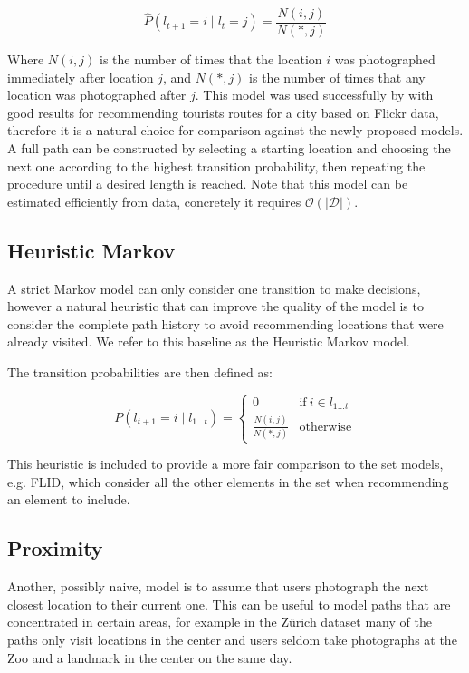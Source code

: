 \begin{equation}
  \hat{P}(l_{t+1} = i \mid l_{t} = j) = \frac{N(i,j)}{N(*,j)}
\end{equation}

Where $N(i,j)$ is the number of times that the location $i$ was photographed immediately after location $j$, and $N(*, j)$ is the number of times that any location was photographed after $j$. This model was used successfully by \citet{Kurashima2010} with good results for recommending tourists routes for a city based on Flickr data, therefore it is a natural choice for comparison against the newly proposed models. A full path can be constructed by selecting a starting location and choosing the next one according to the highest transition probability, then repeating the procedure until a desired length is reached. Note that this model can be estimated efficiently from data, concretely it requires $\mathcal{O}(|\mathcal{D}|)$.

\subsection{Heuristic Markov}

A strict Markov model can only consider one transition to make decisions, however a natural heuristic that can improve the quality of the model is to consider the complete path history to avoid recommending locations that were already visited. We refer to this baseline as the Heuristic Markov model.

The transition probabilities are then defined as:

\begin{equation}
  P(l_{t+1} = i \mid l_{1 \dots t}) = \begin{cases}
  0 & \text{if}\ i \in l_{1 \dots t} \\
  \frac{N(i,j)}{N(*,j)} & \text{otherwise}
  \end{cases}
\end{equation}

This heuristic is included to provide a more fair comparison to the set models, e.g. FLID, which consider all the other elements in the set when recommending an element to include.

\subsection{Proximity}

Another, possibly naive, model is to assume that users photograph the next closest location to their current one. This can be useful to model paths that are concentrated in certain areas, for example in the Zürich dataset many of the paths only visit locations in the center and users seldom take photographs at the Zoo and a landmark in the center on the same day.

